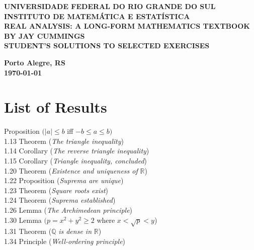 \documentclass[12pt]{article}
\begin{document}
\begin{center}
    \textbf{\large UNIVERSIDADE FEDERAL DO RIO GRANDE DO SUL} \\
    \textbf{\large INSTITUTO DE MATEMÁTICA E ESTATÍSTICA} \\
    \vspace{3cm}
    \textbf{\Large REAL ANALYSIS: A LONG-FORM MATHEMATICS TEXTBOOK BY JAY CUMMINGS} \\
    \vspace{1cm}
    \textbf{\large STUDENT'S SOLUTIONS TO SELECTED EXERCISES} \\
    \vspace{3cm}
    
    \author{Leonardo Suarez}
    
    \vspace{12cm}
    \textbf{\large Porto Alegre, RS} \\
    \textbf{\large\today} \\
\end{center}\newpage

\section*{List of Results}

 Proposition $(|a| \leq b$ iff $-b \leq a \leq b)$  \\
1.13 Theorem (\emph{The triangle inequality})  \\
1.14 Corollary (\emph{The reverse triangle inequality})  \\
1.15 Corollary (\emph{Triangle inequality, concluded})  \\
1.20 Theorem (\emph{Existence and uniqueness of} $\mathbb{R}$)  \\
1.22 Proposition (\emph{Suprema are unique})  \\
1.23 Theorem (\emph{Square roots exist})  \\
1.24 Theorem (\emph{Suprema established})  \\
1.26 Lemma (\emph{The Archimedean principle})  \\
1.30 Lemma $(p = x^2 + y^2 \geq 2$ where $x < \sqrt{p} < y$)  \\
1.31 Theorem ($\mathbb{Q}$ \emph{is dense in} $\mathbb{R}$)  \\
1.34 Principle (\emph{Well-ordering principle})  \\
\end{document}
